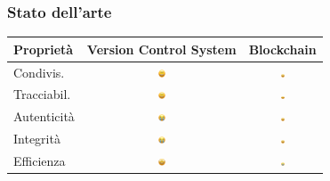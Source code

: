 \documentclass{beamer}
\begin{document}
\begin{frame}
	\frametitle{Stato dell'arte}
	\begin{longtable}{@{}lcc@{}}
		\toprule
		\textbf{Proprietà} & \multicolumn{1}{l}{\textbf{Version Control System}} & \multicolumn{1}{l}{\textbf{Blockchain}} \\* \midrule
		\endfirsthead
		\endhead
		\bottomrule
		\endfoot
		\endlastfoot
		Condivis.    & \includegraphics[width=0.05\textwidth]{joy.png}   & \includegraphics[width=0.05\textwidth]{joy2.png} \\
		Tracciabil.  & \includegraphics[width=0.05\textwidth]{joy.png}   & \includegraphics[width=0.05\textwidth]{joy2.png} \\
		Autenticità  & \includegraphics[width=0.05\textwidth]{sad2.png}         & \includegraphics[width=0.05\textwidth]{joy2.png} \\
		Integrità    & \includegraphics[width=0.05\textwidth]{sad2.png}         & \includegraphics[width=0.05\textwidth]{joy2.png} \\
		Efficienza   & \includegraphics[width=0.05\textwidth]{joy2.png} & \includegraphics[width=0.05\textwidth]{sad2.png}         \\

\end{longtable}
\end{frame}
\end{document}
